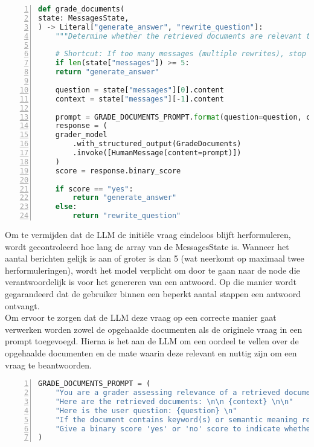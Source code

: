 \begin{lstlisting}[basicstyle=\small, frame=single, breaklines=true, postbreak=\mbox{\textcolor{red}{$\hookrightarrow$}\space}, escapeinside ={\%,}, escapechar={!}, numbers=left, language=Python, caption=Functie die beslist tussen antwoord genereren of vraag herschrijven]
def grade_documents(
state: MessagesState,
) -> Literal["generate_answer", "rewrite_question"]:
    """Determine whether the retrieved documents are relevant to the question."""
    
    # Shortcut: If too many messages (multiple rewrites), stop rewriting
    if len(state["messages"]) >= 5:
    return "generate_answer"
    
    question = state["messages"][0].content
    context = state["messages"][-1].content
    
    prompt = GRADE_DOCUMENTS_PROMPT.format(question=question, context=context)
    response = (
    grader_model
        .with_structured_output(GradeDocuments)
        .invoke([HumanMessage(content=prompt)])
    )
    score = response.binary_score
    
    if score == "yes":
        return "generate_answer"
    else:
        return "rewrite_question"
\end{lstlisting}

Om te vermijden dat de LLM de initiële vraag eindeloos blijft herformuleren, wordt gecontroleerd hoe lang de array van de MessagesState is. Wanneer het aantal berichten gelijk is aan of groter is dan 5 (wat neerkomt op maximaal twee herformuleringen), wordt het model verplicht om door te gaan naar de node die verantwoordelijk is voor het genereren van een antwoord. Op die manier wordt gegarandeerd dat de gebruiker binnen een beperkt aantal stappen een antwoord ontvangt.
\\[1em]
Om ervoor te zorgen dat de LLM deze vraag op een correcte manier gaat verwerken worden zowel de opgehaalde documenten als de originele vraag in een prompt toegevoegd. Hierna is het aan de LLM om een oordeel te vellen over de opgehaalde documenten en de mate waarin deze relevant en nuttig zijn om een vraag te beantwoorden.
\begin{lstlisting}[basicstyle=\small, frame=single, breaklines=true, postbreak=\mbox{\textcolor{red}{$\hookrightarrow$}\space}, escapeinside ={\%,}, escapechar={!}, numbers=left, language=Python, caption=Prompt om opgehaalde documenten te beoordelen op basis van de gestelde vraag]
GRADE_DOCUMENTS_PROMPT = (
    "You are a grader assessing relevance of a retrieved document to a user question. \n "
    "Here are the retrieved documents: \n\n {context} \n\n"
    "Here is the user question: {question} \n"
    "If the document contains keyword(s) or semantic meaning related to the user question, grade it as relevant. \n"
    "Give a binary score 'yes' or 'no' score to indicate whether the document is relevant to the question."
)
\end{lstlisting}

